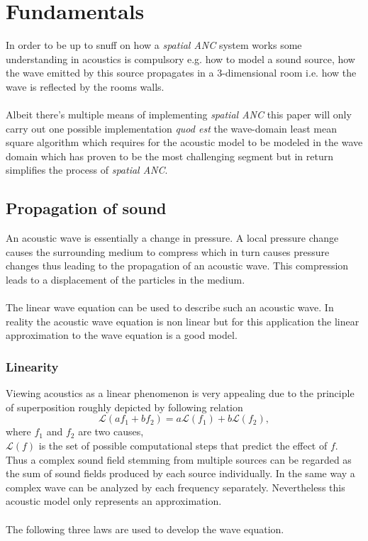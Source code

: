 \chapter{Fundamentals}
\label{chap:fundamentals}
In order to be up to snuff on how a \textit{spatial ANC} system works some understanding in acoustics is compulsory e.g. how to model a sound source, how the wave emitted by this source propagates in a 3-dimensional room i.e. how the wave is reflected by the rooms walls.\\\\
Albeit there's multiple means of implementing \textit{spatial ANC} this paper will only carry out one possible implementation \textit{quod est} the wave-domain least mean square algorithm which requires for the acoustic model to be modeled in the wave domain which has proven to be the most challenging segment but in return simplifies the process of \textit{spatial ANC}.

\section{Propagation of sound}
An acoustic wave is essentially a change in pressure. A local pressure change causes the surrounding medium to compress which in turn causes pressure changes thus leading to the propagation of an acoustic wave. This compression leads to a displacement of the particles in the medium.\\\\
The linear wave equation can be used to describe such an acoustic wave. In reality the acoustic wave equation is non linear but for this application the linear approximation to the wave equation is a good model.\cite{Acoustic}\\
\subsection{Linearity}
Viewing acoustics as a linear phenomenon is very appealing due to the principle of superposition roughly depicted by following relation
\begin{equation}
    \mathcal{L}(af_1+bf_2) = a\mathcal{L}(f_1) + b\mathcal{L}(f_2),
\end{equation}
where
$f_1$ and $f_2$ are two causes,\\
$\mathcal{L}(f)$ is the set of possible computational steps that predict the effect of $f$.\\
Thus a complex sound field stemming from multiple sources can be regarded as the sum of sound fields produced by each source individually. In the same way a complex wave can be analyzed by each frequency separately. Nevertheless this acoustic model only represents an approximation\cite{Rossing2007}.\\
\\
The following three laws are used to develop the wave equation.
